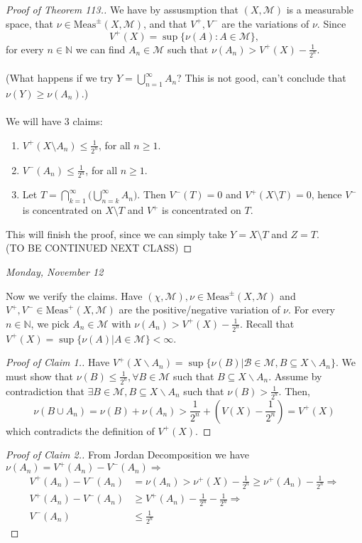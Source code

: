 \documentclass[letterpaper, 12pt]{article}
\newcommand{\cB}{\mathcal{B}}
\newcommand{\cM}{\mathcal{M}}
\newcommand{\bN}{\mathbb{N}}
\newcommand{\Meas}{\mathrm{Meas}}
\theoremstyle{stdthm}
\theoremstyle{stddef}
\theoremstyle{stdnonum}
\theoremstyle{stdqands}
\theoremstyle{stdbold}
\begin{document}
\begin{proof}[Proof of Theorem 113.]
We have by assusmption that $(X,\cM)$ is a measurable space, that $\nu \in\Meas^\pm (X,\cM)$, and that $V^+,V^-$ are the variations of $\nu$. Since 
\[
V^+(X) = \sup\{\nu(A):A\in\cM\},
\]
for every $n\in\bN$ we can find $A_n\in\cM$ such that $\nu(A_n)>V^+(X)-\frac{1}{2^n}$.\\\\ (What happens if we try $Y=\bigcup_{n=1}^\infty A_n$? This is not good, can't conclude that $\nu(Y)\geq \nu(A_n)$.)\\\\ We will have 3 claims:
\begin{enumerate}
\item $V^+(X\setminus A_n) \leq \frac{1}{2^n}$, for all $n\geq 1$.
\item $V^-(A_n) \leq \frac{1}{2^n}$, for all $n\geq 1$.
\item Let $T = \bigcap_{k=1}^\infty\big(\bigcup_{n=k}^\infty A_n\big)$. Then $V^-(T) = 0$ and $V^+(X\setminus T) = 0$, hence $V^-$ is concentrated on $X\setminus T$ and $V^+$ is concentrated on $T$.
\end{enumerate}
This will finish the proof, since we can simply take $Y = X\setminus T$ and $Z=T$.\\
(TO BE CONTINUED NEXT CLASS)
\end{proof}
\begin{center}
\emph{Monday, November 12}
\end{center}
Now we verify the claims. Have $(\chi,\cM), \nu \in \Meas^\pm(X,\cM)$ and $V^+,V^- \in \Meas^+(X,\cM)$ are the positive/negative variation of $\nu$. For every $n \in \bN$, we pick $A_n \in \cM$ with $\nu(A_n)>V^+(X) - \frac{1}{2^n}$. Recall that $V^+(X) = \sup\{\nu(A)|A \in \cM\} < \infty$. 

\begin{proof} [Proof of Claim 1.]
Have $V^+(X\backslash A_n) = \sup \{\nu(B)| \cB \in \cM, B \subseteq X \backslash A_n \}$. We must show that $\nu(B) \leq \frac{1}{2^n}, \forall B \in \cM$ such that $B \subseteq X\backslash A_n$. Assume by contradiction that $\exists B \in \cM, B \subseteq X \backslash A_n$ such that $\nu(B) > \frac{1}{2^n}$.  Then, 
\[\nu(B \cup A_n) = \nu(B) + \nu(A_n) > \frac{1}{2^n} + \left(V(X) - \frac{1}{2^n} \right) = V^+(X) \]
which contradicts the definition of $V^+(X)$. 
\end{proof}

\begin{proof} [Proof of Claim 2.]
From Jordan Decomposition we have $\nu(A_n) = V^+(A_n) - V^-(A_n) \Rightarrow$
\begin{align*}
  V^+(A_n) - V^-(A_n) &= \nu(A_n) > \nu^+(X) - \frac{1}{2^n} \geq  \nu^+(A_n) - \frac{1}{2^n} \Rightarrow \\
  V^+(A_n) - V^-(A_n) & \geq V^+(A_n) - \frac{1}{2^n} - \frac{1}{2^n} \Rightarrow\\
  V^-(A_n) &\leq \frac{1}{2^n}
  \end{align*}

\end{proof}
\end{document}
